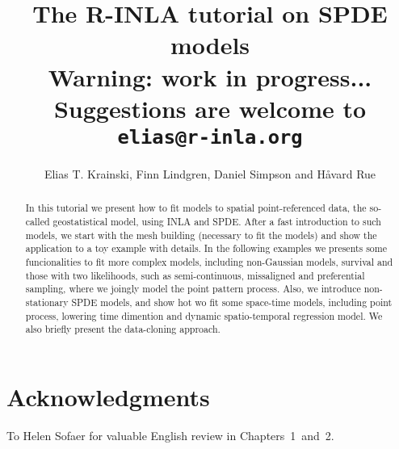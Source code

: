 \documentclass[a4paper,11pt]{report}
\title{\textbf{The R-INLA tutorial on SPDE models}\\
Warning: work in progress...\\
Suggestions are welcome to \texttt{elias@r-inla.org}}
\author{Elias T. Krainski, Finn Lindgren, Daniel Simpson and H{\aa}vard Rue}
\begin{document}
\maketitle

\begin{abstract}
  In this tutorial we present how to fit models 
  to spatial point-referenced data, the so-called 
  geostatistical model, using INLA and SPDE. 
  After a fast introduction to such models, 
  we start with the mesh building 
  (necessary to fit the models) and show the application 
  to a toy example with details. 
  In the following examples we presents some funcionalities 
  to fit more complex models, including non-Gaussian models, 
  survival and those with two likelihoods, such as semi-continuous,  
  missaligned and preferential sampling, where we joingly model 
  the point pattern process. Also, we introduce 
  non-stationary SPDE models, and show hot wo fit 
  some space-time models, including point process, 
  lowering time dimention and dynamic spatio-temporal regression model. 
  We also briefly present the data-cloning approach.
\end{abstract} 

\section{Acknowledgments}
To Helen Sofaer for valuable English review in 
Chapters~1~and~2. 

 

\tableofcontents

 

 
 

 
 
 



 


 



\end{document}
